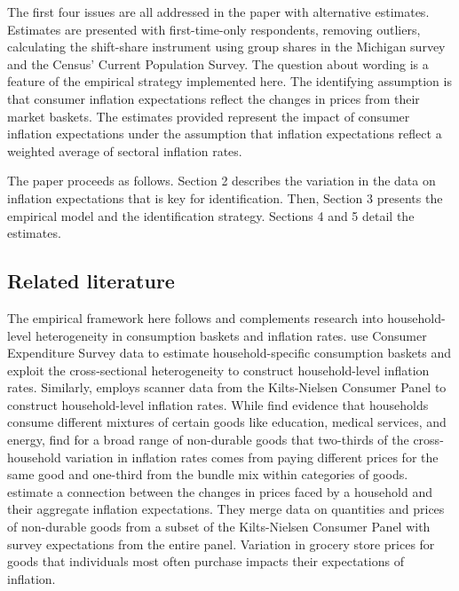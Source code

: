 \documentclass[12pt]{article}
\begin{document}
The first four issues are all addressed in the paper with alternative estimates. Estimates are presented with first-time-only respondents, removing outliers, calculating the shift-share instrument using group shares in the Michigan survey and the Census' Current Population Survey. The question about wording is a feature of the empirical strategy implemented here. The identifying assumption is that consumer inflation expectations reflect the changes in prices from their market baskets. The estimates provided represent the impact of consumer inflation expectations under the assumption that inflation expectations reflect a weighted average of sectoral inflation rates.

The paper proceeds as follows. Section 2 describes the variation in the data on inflation expectations that is key for identification. Then, Section 3 presents the empirical model and the identification strategy. Sections 4 and 5 detail the estimates.

\subsection{Related literature}

The empirical framework here follows and complements research into household-level heterogeneity in consumption baskets and inflation rates. \cite{HobijnLagakos:2005} use Consumer Expenditure Survey data to estimate household-specific consumption baskets and exploit the cross-sectional heterogeneity to construct household-level inflation rates. Similarly, \cite{KaplanWohl:JME2017} employs scanner data from the Kilts-Nielsen Consumer Panel to construct household-level inflation rates. While \cite{HobijnLagakos:2005} find evidence that households consume different mixtures of certain goods like education, medical services, and energy, \cite{KaplanWohl:JME2017} find for a broad range of non-durable goods that two-thirds of the cross-household variation in inflation rates comes from paying different prices for the same good and one-third from the bundle mix within categories of goods. \cite{KaplanWohl:JME2017} estimate a connection between the changes in prices faced by a household and their aggregate inflation expectations. They merge data on quantities and prices of non-durable goods from a subset of the Kilts-Nielsen Consumer Panel with survey expectations from the entire panel. Variation in grocery store prices for goods that individuals most often purchase impacts their expectations of inflation.
\end{document}
